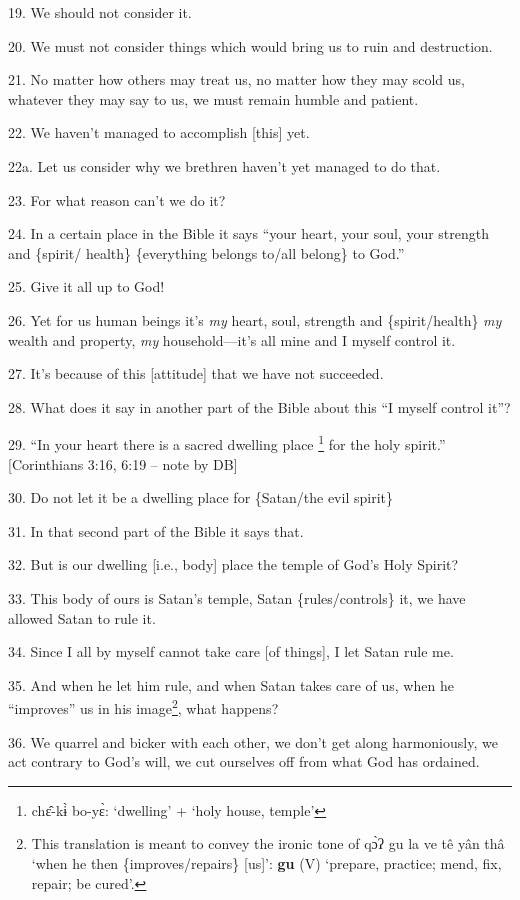 19. We should not consider it.

20. We must not consider things which would bring us to ruin and destruction.

21. No matter how others may treat us, no matter how they may scold us, whatever
they may say to us, we must remain humble and patient.

22. We haven't managed to accomplish [this] yet.

22a. Let us consider why we brethren haven't yet managed to do that.

23. For what reason can't we do it?

24. In a certain place in the Bible it says ``your heart, your soul, your strength
and \{spirit/ health\} \{everything belongs to/all belong\} to God.''

25. Give it all up to God!

26. Yet for us human beings it's \textit{my} heart, soul, strength and \{spirit/health\}
\textit{my} wealth and property, \textit{my }household---it's all mine and I myself
control it.

27. It's because of this [attitude] that we have not succeeded.

28. What does it say in another part of the Bible about this ``I myself control
it''?

29. ``In your heart there is a sacred dwelling place \footnote{chɛ̂-kɨ̀ bo-yɛ̀: `dwelling' + `holy house, temple'} for the holy spirit.''
[Corinthians 3:16, 6:19 -- note by DB]

30. Do not let it be a dwelling place for \{Satan/the evil spirit\}

31. In that second part of the Bible it says that.

32. But is our dwelling [i.e., body] place the temple of God's Holy Spirit?

33. This body of ours is Satan's temple, Satan \{rules/controls\} it, we have allowed
Satan to rule it.

34. Since I all by myself cannot take care [of things], I let Satan rule me.

35. And when he let him rule, and when Satan takes care of us, when he ``improves''
us in his image\footnote{This translation is meant to convey the ironic tone of qɔ̀ʔ gu la ve tê yân thâ `when he then \{improves/repairs\} [us]': \textbf{gu} (V) `prepare, practice; mend, fix, repair; be cured'.}, what happens?

36. We quarrel and bicker with each other, we don't get along harmoniously, we
act contrary to God's will, we cut ourselves off from what God has ordained.

